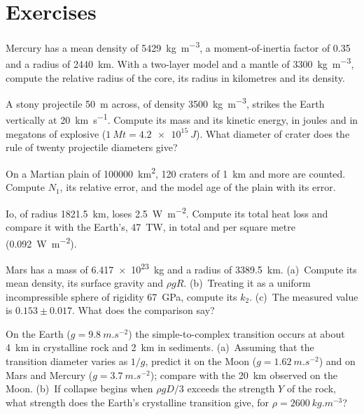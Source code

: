 \section{Exercises}

\begin{exercise}[$\star$]\label{exo:b3:planetary-interiors-surfaces:1}
Mercury has a mean density of \qty{5429}{kg.m^{-3}}, a moment-of-inertia
factor of 0.35 and a radius of \qty{2440}{km}. With a two-layer model and a
mantle of \qty{3300}{kg.m^{-3}}, compute the relative radius of the core,
its radius in kilometres and its density.
\end{exercise}

\begin{exercise}[$\star$]\label{exo:b3:planetary-interiors-surfaces:2}
A stony projectile \qty{50}{m} across, of density \qty{3500}{kg.m^{-3}},
strikes the Earth vertically at \qty{20}{km.s^{-1}}. Compute its mass and
its kinetic energy, in joules and in megatons of explosive
($\qty{1}{Mt} = \qty{4.2e15}{J}$). What diameter of crater does the rule
of twenty projectile diameters give?
\end{exercise}

\begin{exercise}[$\star$]\label{exo:b3:planetary-interiors-surfaces:3}
On a Martian plain of \qty{100000}{km^2}, 120 craters of \qty{1}{km} and
more are counted. Compute $N_1$, its relative error, and the model age of
the plain with its error.
\end{exercise}

\begin{exercise}[$\star$]\label{exo:b3:planetary-interiors-surfaces:4}
Io, of radius \qty{1821.5}{km}, loses \qty{2.5}{W.m^{-2}}. Compute its
total heat loss and compare it with the Earth's, \qty{47}{TW}, in total and
per square metre (\qty{0.092}{W.m^{-2}}).
\end{exercise}

\begin{exercise}[$\star\star$]\label{exo:b3:planetary-interiors-surfaces:5}
Mars has a mass of \qty{6.417e23}{kg} and a radius of \qty{3389.5}{km}.
(a)~Compute its mean density, its surface gravity and $\rho gR$.
(b)~Treating it as a uniform incompressible sphere of rigidity
\qty{67}{GPa}, compute its  $k_2$. (c)~The measured value is
$0.153 \pm 0.017$. What does the comparison say?
\end{exercise}

\begin{exercise}[$\star\star$]\label{exo:b3:planetary-interiors-surfaces:6}
On the Earth ($g = \qty{9.8}{m.s^{-2}}$) the simple-to-complex transition
occurs at about \qty{4}{km} in crystalline rock and \qty{2}{km} in
sediments. (a)~Assuming that the transition diameter varies as $1/g$,
predict it on the Moon ($g = \qty{1.62}{m.s^{-2}}$) and on Mars and
Mercury ($g = \qty{3.7}{m.s^{-2}}$); compare with the \qty{20}{km}
observed on the Moon. (b)~If collapse begins when $\rho gD/3$ exceeds the
strength $Y$ of the rock, what strength does the Earth's crystalline
transition give, for $\rho = \qty{2600}{kg.m^{-3}}$?
\end{exercise}

